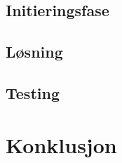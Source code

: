 \documentclass[a4paper,11pt]{report}
\begin{document}
\section{Initieringsfase}


\newpage
\section{Løsning}

\section{Testing}

\chapter{Konklusjon}



\appendix




\clearpage 
 
 
\end{document}
